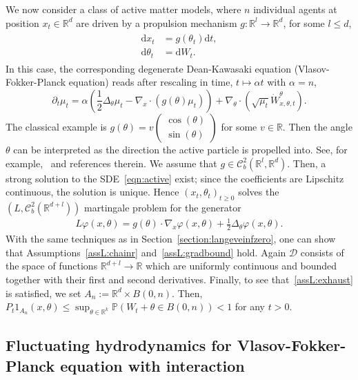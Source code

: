 \documentclass{article}
\newcommand{\dd}{\text{d}}
\renewcommand{\P}{\mathbb{P}}
\newcommand{\R}{\mathbb{R}}
\newcommand{\C}{\mathcal C}
\begin{document}
We now consider a class of active matter models, where $n$ individual agents at position $x_t \in \R^d$ are
driven by a propulsion mechanism $g\colon \R^l \to \R^d$, for some $l \leq d$,
\begin{align}
    \begin{split}
        \dd x_t &= g(\theta_t) \dd t,\\
    \dd \theta_t &= \dd W_t.
    \end{split} \label{eqn:active}
\end{align}
In this case, the corresponding degenerate Dean-Kawasaki equation (Vlasov-Fokker-Planck equation) reads after
rescaling in time, $t \mapsto \alpha t$ with $\alpha = n$,
\begin{equation*}
  \partial_t \mu_t = \alpha\left(\frac{1}{2} \Delta_\theta \mu_t -  \nabla_x \cdot (g(\theta) \mu_t)\right)
  + \nabla_\theta \cdot (\sqrt{\mu_t} \dot W_{x,\theta,t}^\theta).
\end{equation*}
The classical example is $g(\theta) = v \begin{pmatrix} \cos(\theta) \\ \sin(\theta)
\end{pmatrix}$ for some $v \in \R$. Then the angle $\theta$ can be interpreted as the direction the active
particle is propelled into. See, for example,~\cite{Peruani2008a,Bauerle2018a} and references therein. We
assume that $g \in \C^2_b\left(\R^l, \R^d\right)$.  Then, a strong solution to the SDE~\eqref{eqn:active}
exist; since the coefficients are Lipschitz continuous, the solution is unique. Hence
$(x_t, \theta_t)_{t \geq 0}$ solves the $\left(L, \C^2_b\left(\R^{d+l}\right)\right)$ martingale problem for
the generator
\begin{align*}
    L \varphi(x,\theta) = g(\theta) \cdot \nabla_x \varphi(x,\theta) + \frac{1}{2}\Delta_\theta \varphi(x,\theta).
\end{align*}
With the same techniques as in Section~\ref{section:langeveinfzero}, one can show that
Assumptions~\ref{assL:chainr} and~\ref{assL:gradbound} hold.  Again $\mathcal D$ consists of the space of
functions $\R^{d +l} \to \R$ which are uniformly continuous and bounded together with their first and second
derivatives.
Finally, to see that~\ref{assL:exhaust} is satisfied, we set $A_n := \R^d \times B(0,n)$. Then,
$P_t 1_{A_n}(x,\theta) \leq \sup_{\theta \in \R^k} \P(W_t + \theta \in B(0,n)) < 1$ for any $t > 0$. 


\subsection{Fluctuating hydrodynamics for Vlasov-Fokker-Planck equation with interaction}
\label{section:langeveinfnotzero}
\end{document}
